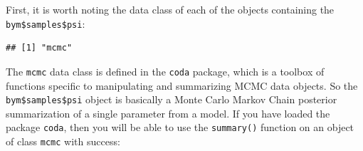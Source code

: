 \documentclass[
]{book}
\newenvironment{Shaded}{\begin{snugshade}}{\end{snugshade}}
\newcommand{\AttributeTok}[1]{\textcolor[rgb]{0.13,0.29,0.53}{#1}}
\newcommand{\CommentTok}[1]{\textcolor[rgb]{0.56,0.35,0.01}{\textit{#1}}}
\newcommand{\DecValTok}[1]{\textcolor[rgb]{0.00,0.00,0.81}{#1}}
\newcommand{\FloatTok}[1]{\textcolor[rgb]{0.00,0.00,0.81}{#1}}
\newcommand{\FunctionTok}[1]{\textcolor[rgb]{0.13,0.29,0.53}{\textbf{#1}}}
\newcommand{\NormalTok}[1]{#1}
\newcommand{\OtherTok}[1]{\textcolor[rgb]{0.56,0.35,0.01}{#1}}
\newcommand{\SpecialCharTok}[1]{\textcolor[rgb]{0.81,0.36,0.00}{\textbf{#1}}}
\begin{document}
First, it is worth noting the data class of each of the objects containing the \texttt{bym\$samples\$psi}:

\begin{Shaded}
\end{Shaded}

\begin{verbatim}
## [1] "mcmc"
\end{verbatim}

The \texttt{mcmc} data class is defined in the \texttt{coda} package, which is a toolbox of functions specific to manipulating and summarizing MCMC data objects. So the \texttt{bym\$samples\$psi} object is basically a Monte Carlo Markov Chain posterior summarization of a single parameter from a model. If you have loaded the package \texttt{coda}, then you will be able to use the \texttt{summary()} function on an object of class \texttt{mcmc} with success:

\begin{Shaded}
\end{Shaded}
\end{document}
